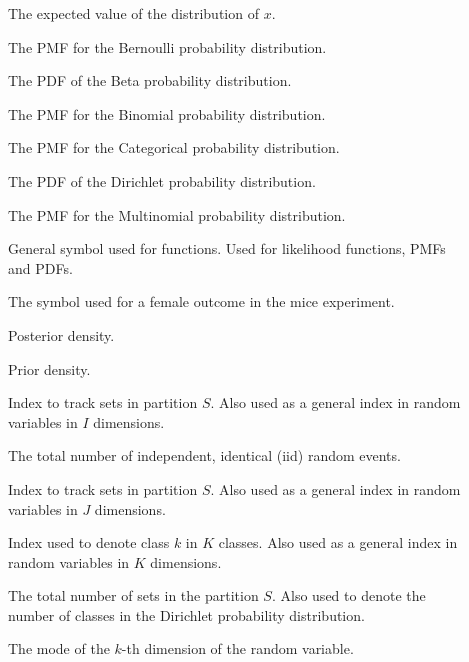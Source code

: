 \begin{description}
	\item [\parbox{2cm}{$E[x]$}] \parbox{12.5cm}{The expected value of the distribution of $x$.}
	\item [\parbox{2cm}{$f_{Ber}$}] \parbox{12.5cm}{The \acs{PMF} for the Bernoulli probability distribution.}
	\item [\parbox{2cm}{$f_{Beta}$}] \parbox{12.5cm}{The \acs{PDF} of the Beta probability distribution.}
	\item [\parbox{2cm}{$f_{Bin}$}] \parbox{12.5cm}{The \acs{PMF} for the Binomial probability distribution.}
	\item [\parbox{2cm}{$f_{Cat}$}] \parbox{12.5cm}{The \acs{PMF} for the Categorical probability distribution.}
	\item [\parbox{2cm}{$f_{Dir}$}] \parbox{12.5cm}{The \acs{PDF} of the Dirichlet probability distribution.}
	\item [\parbox{2cm}{$f_{Mul}$}] \parbox{12.5cm}{The \acs{PMF} for the Multinomial probability distribution.}
	\item [\parbox{2cm}{$f$}] \parbox{12.5cm}{General symbol used for functions. Used for likelihood functions, \acp{PMF} and \acp{PDF}.}
	\item [\parbox{2cm}{$F$}] \parbox{12.5cm}{The symbol used for a female outcome in the mice experiment.}
	\item [\parbox{2cm}{$g^{*}$}] \parbox{12.5cm}{Posterior density.}
	\item [\parbox{2cm}{$g$}] \parbox{12.5cm}{Prior density.}
	\item [\parbox{2cm}{$i$}] \parbox{12.5cm}{Index to track sets in partition $S$. Also used as a general index in random variables in $I$ dimensions.}
	\item [\parbox{2cm}{$I$}] \parbox{12.5cm}{The total number of independent, identical (iid) random events.}
	\item [\parbox{2cm}{$j$}] \parbox{12.5cm}{Index to track sets in partition $S$. Also used as a general index in random variables in $J$ dimensions.}
	\item [\parbox{2cm}{$k$}] \parbox{12.5cm}{Index used to denote class $k$ in $K$ classes. Also used as a general index in random variables in $K$ dimensions.}
	\item [\parbox{2cm}{$K$}] \parbox{12.5cm}{The total number of sets in the partition $S$. Also used to denote the number of classes in the Dirichlet probability distribution.}
	\item [\parbox{2cm}{$M[x_{k}]$}] \parbox{12.5cm}{The mode of the $k$-th dimension of the random variable.}

\end{description}

